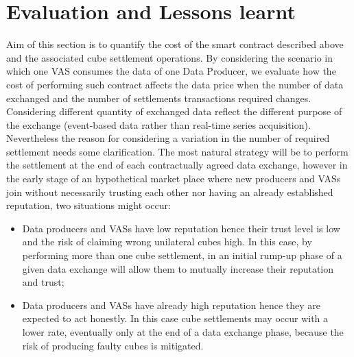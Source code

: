 \begin{table}[]
	\centering
	\caption{Execution cost of cube settlment contract operations.}
	\label{tab:execution_costl}
\end{table}

\section{Evaluation and Lessons learnt}
\label{sec:evaluation}
Aim of this section is to quantify the cost of the smart contract described above and the associated cube settlement operations. By considering the scenario in which one VAS consumes the data of one Data Producer, we evaluate how the cost of performing such contract affects the data price when the number of data exchanged and the number of settlements transactions required changes. Considering different quantity of exchanged data reflect the different purpose of the exchange (event-based data rather than real-time series acquisition). Nevertheless the reason for considering a variation in the number of required settlement needs some clarification. The most natural strategy will be to perform the settlement at the end of each contractually agreed data exchange, however in the early stage of an hypothetical market place where new producers and VASs join without necessarily trusting each other nor having an already established reputation, two situations might occur:
\begin{itemize}
	\item {Data producers and VASs have low reputation hence their trust level is low and the risk of claiming wrong unilateral cubes high. In this case, by performing more than one cube settlement, in an initial rump-up phase of a given data exchange will allow them to mutually increase their reputation and trust;}
	\item {Data producers and VASs have already high reputation hence they are expected to act honestly. In this case cube settlements may occur with a lower rate, eventually only at the end of a data exchange phase, because the risk of producing faulty cubes is mitigated.}
\end{itemize}


